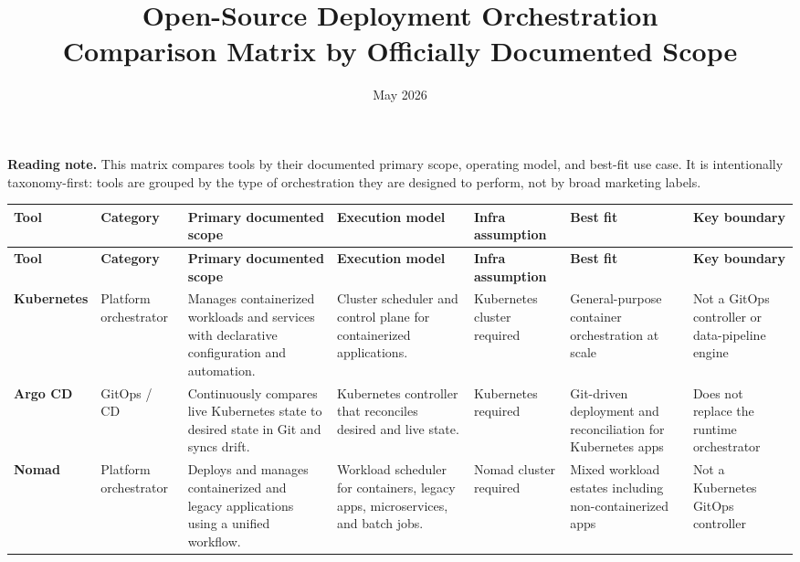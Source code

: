 \documentclass[10pt]{article}
\title{Open-Source Deployment Orchestration\\\large Comparison Matrix by Officially Documented Scope}
\author{}
\date{May 2026}
\begin{document}
\maketitle

\textbf{Reading note.} This matrix compares tools by their documented primary scope, operating model, and best-fit use case. It is intentionally taxonomy-first: tools are grouped by the type of orchestration they are designed to perform, not by broad marketing labels.\cite{KubernetesOverview,ArgoCDHome,AnsiblePlaybooks,AirflowHome,TemporalWhatIs,KubeflowIntro}

\begin{landscape}
\small
\begin{longtable}{>{\raggedright\arraybackslash}p{2.3cm} >{\raggedright\arraybackslash}p{2.2cm} >{\raggedright\arraybackslash}p{3.6cm} >{\raggedright\arraybackslash}p{3.3cm} >{\raggedright\arraybackslash}p{2.5cm} >{\raggedright\arraybackslash}p{3.0cm} >{\raggedright\arraybackslash}p{3.2cm}}
\toprule
\textbf{Tool} & \textbf{Category} & \textbf{Primary documented scope} & \textbf{Execution model} & \textbf{Infra assumption} & \textbf{Best fit} & \textbf{Key boundary} \\
\midrule
\endfirsthead
\toprule
\textbf{Tool} & \textbf{Category} & \textbf{Primary documented scope} & \textbf{Execution model} & \textbf{Infra assumption} & \textbf{Best fit} & \textbf{Key boundary} \\
\midrule
\endhead
\bottomrule
\endfoot
\textbf{Kubernetes} & Platform orchestrator & Manages containerized workloads and services with declarative configuration and automation.\cite{KubernetesOverview} & Cluster scheduler and control plane for containerized applications.\cite{KubernetesOverview} & Kubernetes cluster required & General-purpose container orchestration at scale & Not a GitOps controller or data-pipeline engine \\

\textbf{Argo CD} & GitOps / CD & Continuously compares live Kubernetes state to desired state in Git and syncs drift.\cite{ArgoCDHome,ArgoCDDeclarative} & Kubernetes controller that reconciles desired and live state.\cite{ArgoCDHome} & Kubernetes required & Git-driven deployment and reconciliation for Kubernetes apps & Does not replace the runtime orchestrator \\

\textbf{Nomad} & Platform orchestrator & Deploys and manages containerized and legacy applications using a unified workflow.\cite{NomadWhatIs} & Workload scheduler for containers, legacy apps, microservices, and batch jobs.\cite{NomadWhatIs} & Nomad cluster required & Mixed workload estates including non-containerized apps & Not a Kubernetes GitOps controller \\


\end{longtable}
\end{landscape}
\end{document}
